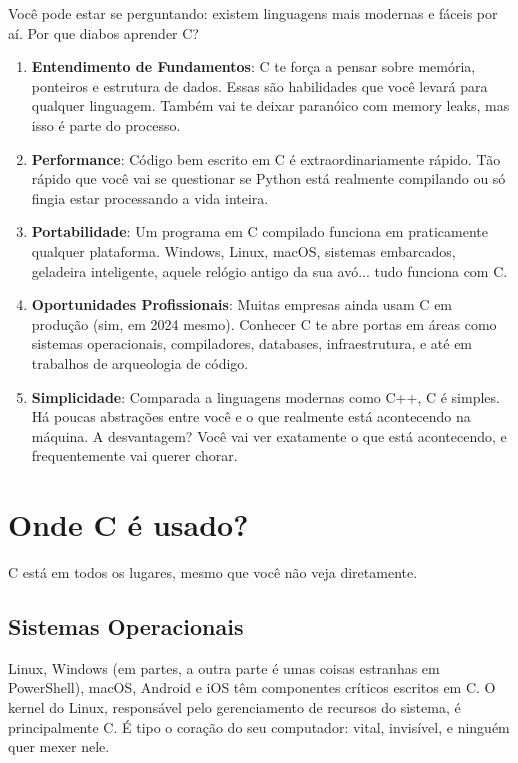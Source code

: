 Você pode estar se perguntando: existem linguagens mais modernas e fáceis por aí. Por que diabos aprender C?

\begin{enumerate}
\item \textbf{Entendimento de Fundamentos}: C te força a pensar sobre memória, ponteiros e estrutura de dados. Essas são habilidades que você levará para qualquer linguagem. Também vai te deixar paranóico com memory leaks, mas isso é parte do processo.
\item \textbf{Performance}: Código bem escrito em C é extraordinariamente rápido. Tão rápido que você vai se questionar se Python está realmente compilando ou só fingia estar processando a vida inteira.
\item \textbf{Portabilidade}: Um programa em C compilado funciona em praticamente qualquer plataforma. Windows, Linux, macOS, sistemas embarcados, geladeira inteligente, aquele relógio antigo da sua avó... tudo funciona com C.
\item \textbf{Oportunidades Profissionais}: Muitas empresas ainda usam C em produção (sim, em 2024 mesmo). Conhecer C te abre portas em áreas como sistemas operacionais, compiladores, databases, infraestrutura, e até em trabalhos de arqueologia de código.
\item \textbf{Simplicidade}: Comparada a linguagens modernas como C++, C é simples. Há poucas abstrações entre você e o que realmente está acontecendo na máquina. A desvantagem? Você vai ver exatamente o que está acontecendo, e frequentemente vai querer chorar.
\end{enumerate}

\section{Onde C é usado?}

C está em todos os lugares, mesmo que você não veja diretamente.

\subsection{Sistemas Operacionais}

Linux, Windows (em partes, a outra parte é umas coisas estranhas em PowerShell), macOS, Android e iOS têm componentes críticos escritos em C. O kernel do Linux, responsável pelo gerenciamento de recursos do sistema, é principalmente C. É tipo o coração do seu computador: vital, invisível, e ninguém quer mexer nele.

